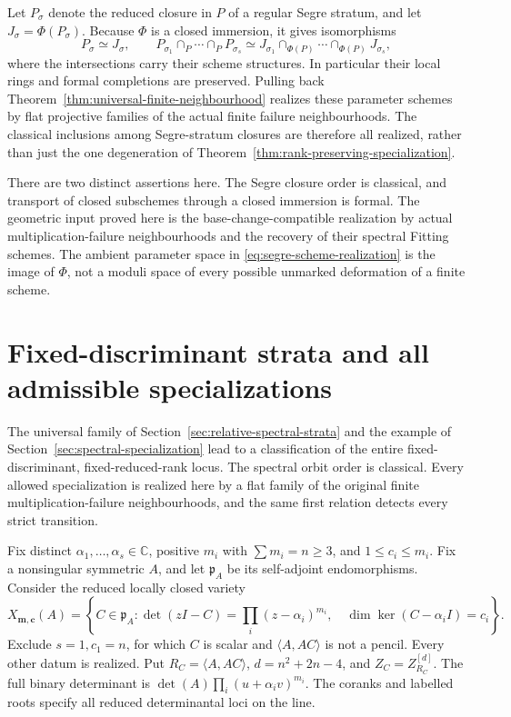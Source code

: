 \documentclass[11pt,reqno]{amsart}
\numberwithin{equation}{section}
\theoremstyle{definition}\newtheorem{definition}[theorem]{Definition}
\theoremstyle{remark}\newtheorem{remark}[theorem]{Remark}
\newcommand{\C}{\mathbb C}\newcommand{\Q}{\mathbb Q}
\begin{document}
Let \(P_\sigma\) denote the reduced closure in \(P\) of a
regular Segre stratum, and let \(J_\sigma=\Phi(P_\sigma)\).
Because \(\Phi\) is a closed immersion, it gives isomorphisms
\begin{equation}\label{eq:segre-scheme-realization}
 P_\sigma\simeq J_\sigma,
 \qquad
 P_{\sigma_1}\cap_P\cdots\cap_P P_{\sigma_s}
 \simeq
 J_{\sigma_1}\cap_{\Phi(P)}\cdots\cap_{\Phi(P)}J_{\sigma_s},
\end{equation}
where the intersections carry their scheme structures.  In
particular their local rings and formal completions are preserved.
Pulling back Theorem~\ref{thm:universal-finite-neighbourhood} realizes
these parameter schemes by flat projective families of the actual
finite failure neighbourhoods.  The classical inclusions among
Segre-stratum closures \cite[Theorem~5.1]{FevolaMandelshtamSturmfels}
are therefore all realized, rather than just the one degeneration
of Theorem~\ref{thm:rank-preserving-specialization}.

There are two distinct assertions here.  The Segre closure order is
classical, and transport of closed subschemes through a closed
immersion is formal.  The geometric input proved here is the
base-change-compatible realization by actual multiplication-failure
neighbourhoods and the recovery of their spectral Fitting schemes.
The ambient parameter space in \eqref{eq:segre-scheme-realization}
is the image of \(\Phi\), not a moduli space of every possible
unmarked deformation of a finite scheme.

\section{Fixed-discriminant strata and all admissible specializations}
\label{sec:fixed-spectral-strata}

The universal family of Section~\ref{sec:relative-spectral-strata}
and the example of Section~\ref{sec:spectral-specialization}
lead to a classification of the entire fixed-discriminant,
fixed-reduced-rank locus. The spectral orbit order is classical.
Every allowed specialization is realized here by a flat family of
the original finite multiplication-failure neighbourhoods, and the
same first relation detects every strict transition.

Fix distinct \(\alpha_1,\ldots,\alpha_s\in\C\), positive
\(m_i\) with \(\sum m_i=n\ge3\), and \(1\le c_i\le m_i\).
Fix a nonsingular symmetric \(A\), and let \(\mathfrak p_A\)
be its self-adjoint endomorphisms. Consider the reduced locally closed
variety
\begin{equation}\label{eq:fixed-spectral-locus}
 X_{\boldsymbol m,\boldsymbol c}(A)=
 \left\{C\in\mathfrak p_A:
 \det(zI-C)=\prod_i(z-\alpha_i)^{m_i},\quad
 \dim\ker(C-\alpha_i I)=c_i\right\}.
\end{equation}
Exclude \(s=1,c_1=n\), for which \(C\) is scalar and
\(\langle A,AC\rangle\) is not a pencil. Every other datum
is realized. Put \(R_C=\langle A,AC\rangle\),
\(d=n^2+2n-4\), and \(Z_C=Z_{R_C}^{[d]}\).
The full binary determinant is
\(\det(A)\prod_i(u+\alpha_i v)^{m_i}\). The coranks and
labelled roots specify all reduced determinantal loci on the line.
\end{document}
